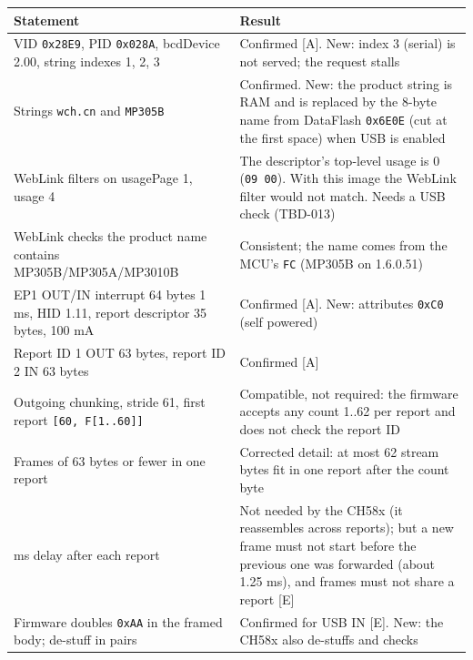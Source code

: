 {\def\LTcaptype{none} %
\begin{longtable}[]{@{}
  >{\raggedright\arraybackslash}p{}
  >{\raggedright\arraybackslash}p{}@{}}
\toprule\noalign{}
\begin{minipage}[b]{\linewidth}\raggedright
Statement
\end{minipage} & \begin{minipage}[b]{\linewidth}\raggedright
Result
\end{minipage} \\
\midrule\noalign{}
\endhead
\bottomrule\noalign{}
\endlastfoot
VID \texttt{0x28E9}, PID \texttt{0x028A}, bcdDevice 2.00, string indexes
1, 2, 3 & Confirmed {[}A{]}. New: index 3 (serial) is not served; the
request stalls \\
Strings \texttt{wch.cn} and \texttt{MP305B} & Confirmed. New: the
product string is RAM and is replaced by the 8-byte name from DataFlash
\texttt{0x6E0E} (cut at the first space) when USB is enabled \\
WebLink filters on usagePage 1, usage 4 & The descriptor's top-level
usage is 0 (\texttt{09\ 00}). With this image the WebLink filter would
not match. Needs a USB check (TBD-013) \\
WebLink checks the product name contains MP305B/MP305A/MP3010B &
Consistent; the name comes from the MCU's \texttt{FC} (MP305B on
1.6.0.51) \\
EP1 OUT/IN interrupt 64 bytes 1 ms, HID 1.11, report descriptor 35
bytes, 100 mA & Confirmed {[}A{]}. New: attributes \texttt{0xC0} (self
powered) \\
Report ID 1 OUT 63 bytes, report ID 2 IN 63 bytes & Confirmed {[}A{]} \\
Outgoing chunking, stride 61, first report
\texttt{{[}60,\ F{[}1..60{]}{]}} & Compatible, not required: the
firmware accepts any count 1..62 per report and does not check the
report ID \\
Frames of 63 bytes or fewer in one report & Corrected detail: at most 62
stream bytes fit in one report after the count byte \\
5 ms delay after each report & Not needed by the CH58x (it reassembles
across reports); but a new frame must not start before the previous one
was forwarded (about 1.25 ms), and frames must not share a report
{[}E{]} \\
Firmware doubles \texttt{0xAA} in the framed body; de-stuff in pairs &
Confirmed for USB IN {[}E{]}. New: the CH58x also de-stuffs and checks

\end{longtable}}
